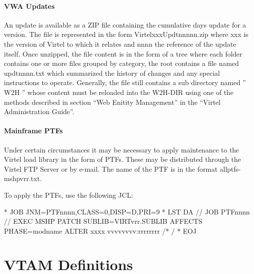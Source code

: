 \documentclass[letterpaper,10pt,english]{sphinxmanual}
\begin{document}
\subsubsection{VWA Updates}
\label{\detokenize{Installation_Guide:vwa-updates}}
An update is available as a ZIP file containing the cumulative days update for a version. The file is represented in the form VirtelxxxUpdtnnnnn.zip where xxx is the version of Virtel to which it relates and nnnn the reference of the update itself. Once unzipped, the file content is in the form of a tree where each folder contains one or more files grouped by category, the root contains a file named updtnnnn.txt which summarized the history of changes and any special instructions to operate. Generally, the file still contains a sub directory named ” W2H ” whose content must be reloaded into the W2H-DIR using one of the methods described in section “Web Enitity Management” in the “Virtel Administration Guide”.


\subsubsection{Mainframe PTFs}
\label{\detokenize{Installation_Guide:mainframe-ptfs}}
Under certain circumstances it may be necessary to apply maintenance to the Virtel load library in the form of PTFs. These may be distributed through the Virtel FTP Server or by e-mail. The name of the PTF is in the format allptfs-mshpvrr.txt.

To apply the PTFs, use the following JCL:

\begin{sphinxVerbatim}[commandchars=\\\{\}]
* \PYGZdl{}\PYGZdl{} JOB JNM=PTFnnnn,CLASS=0,DISP=D,PRI=9
* \PYGZdl{}\PYGZdl{} LST DA
// JOB PTFnnnn
// EXEC MSHP
  PATCH SUBLIB=VIRTvrr.SUBLIB
  AFFECTS PHASE=modname
  ALTER xxxx vvvvvvvv:rrrrrrrr
/*
/\PYGZam{}
* \PYGZdl{}\PYGZdl{} EOJ
\end{sphinxVerbatim}


\ignorespaces 

\chapter{VTAM Definitions}
\label{\detokenize{Installation_Guide:vtam-definitions}}\label{\detokenize{Installation_Guide:index-20}}
\end{document}
